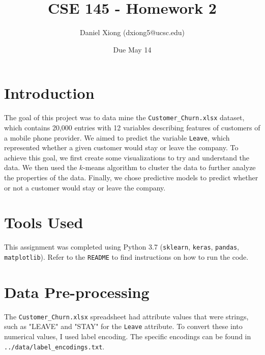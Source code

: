 \documentclass[12pt, notitlepage]{article}
\title{CSE 145 - Homework 2}
\author{Daniel Xiong (dxiong5@ucsc.edu)}
\date{Due May 14}
\begin{document}
\maketitle
\section{Introduction}
The goal of this project was to data mine the \texttt{Customer\_Churn.xlsx} dataset, which contains 20,000 entries with 12 variables describing features of customers of a mobile phone provider. We aimed to predict the variable \texttt{Leave}, which represented whether a given customer would stay or leave the company. To achieve this goal, we first create some visualizations to try and understand the data. We then used the $k$-means algorithm to cluster the data to further analyze the properties of the data. Finally, we chose predictive models to predict whether or not a customer would stay or leave the company.

\section{Tools Used}
This assignment was completed using Python 3.7 (\texttt{sklearn}, \texttt{keras}, \texttt{pandas}, \texttt{matplotlib}). Refer to the \texttt{README} to find instructions on how to run the code.

\section{Data Pre-processing}
The \texttt{Customer\_Churn.xlsx} spreadsheet had attribute values that were strings, such as "LEAVE" and "STAY" for the \texttt{Leave} attribute. To convert these into numerical values, I used label encoding. The specific encodings can be found in \texttt{../data/label\_encodings.txt}.
\end{document}
